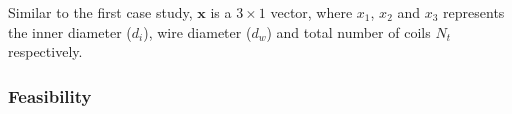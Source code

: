 \documentclass[10pt]{article}
\begin{document}
%			
%    

\begin{flushleft}
Similar to the first case study, $\textbf{x}$ is a $3 \times 1$ vector, where $x_{1}$, $x_{2}$ and $x_{3}$ represents the inner diameter ($d_{i}$), wire diameter ($d_{w}$) and total number of coils $N_{t}$ respectively.
\end{flushleft}


\newpage
\subsubsection{Feasibility}
	
\end{document}
